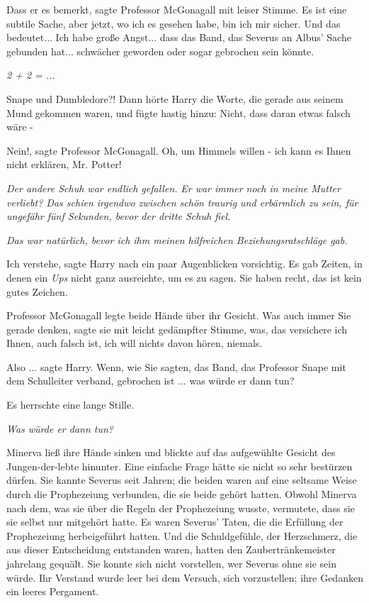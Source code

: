 \glqq Dass er es bemerkt\grqq{}, sagte Professor McGonagall mit leiser Stimme.
\glqq Es ist eine subtile Sache, aber jetzt, wo ich es gesehen habe, bin ich mir
sicher. Und das bedeutet... Ich habe große Angst... dass das Band, das Severus
an Albus' Sache gebunden hat... schwächer geworden oder sogar gebrochen sein
könnte.\grqq{}

\emph{2 + 2 = ...}

\glqq Snape und Dumbledore?!\grqq{} Dann hörte Harry die Worte, die gerade aus
seinem Mund gekommen waren, und fügte hastig hinzu: \glqq Nicht, dass daran
etwas falsch wäre -\grqq{}

\glqq Nein!\grqq{}, sagte Professor McGonagall. \glqq Oh, um Himmels willen -
ich kann es Ihnen nicht erklären, Mr. Potter!\grqq{}

\emph{Der andere Schuh war endlich gefallen.}
\emph{Er war immer noch in meine Mutter verliebt? Das schien irgendwo zwischen schön traurig und erbärmlich zu sein, für ungefähr fünf Sekunden, bevor der dritte Schuh fiel.}

\emph{Das war natürlich, bevor ich ihm meinen hilfreichen Beziehungsratschläge gab.}

\glqq Ich verstehe\grqq{}, sagte Harry nach ein paar Augenblicken vorsichtig. Es
gab Zeiten, in denen ein \glqq \emph{Ups}\grqq{} nicht ganz ausreichte, um es zu
sagen. \glqq Sie haben recht, das ist kein gutes Zeichen.\grqq{}

Professor McGonagall legte beide Hände über ihr Gesicht. \glqq Was auch immer
Sie gerade denken\grqq{}, sagte sie mit leicht gedämpfter Stimme, \glqq was, das
versichere ich Ihnen, auch falsch ist, ich will nichts davon hören,
niemals.\grqq{}

\glqq Also ...\grqq{} sagte Harry. \glqq Wenn, wie Sie sagten, das Band, das
Professor Snape mit dem Schulleiter verband, gebrochen ist ... was würde er dann
tun?\grqq{}

Es herrschte eine lange Stille.

\emph{Was würde er dann tun?}

Minerva ließ ihre Hände sinken und blickte auf das aufgewühlte Gesicht des
Jungen-der-lebte hinunter. Eine einfache Frage hätte sie nicht so sehr bestürzen
dürfen. Sie kannte Severus seit Jahren; die beiden waren auf eine seltsame Weise
durch die Prophezeiung verbunden, die sie beide gehört hatten. Obwohl Minerva
nach dem, was sie über die Regeln der Prophezeiung wusste, vermutete, dass sie
sie selbst nur mitgehört hatte. Es waren Severus' Taten, die die Erfüllung der
Prophezeiung herbeigeführt hatten. Und die Schuldgefühle, der Herzschmerz, die
aus dieser Entscheidung entstanden waren, hatten den Zaubertränkemeister
jahrelang gequält. Sie konnte sich nicht vorstellen, wer Severus ohne sie sein
würde. Ihr Verstand wurde leer bei dem Versuch, sich vorzustellen; ihre Gedanken
ein leeres Pergament.

